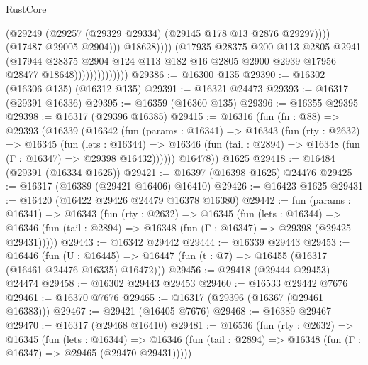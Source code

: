 \begin{lexlean}{RustCore}
\begin{coremodule}
                                          (@29249
                                            (@29257
                                              (@29329 @29334)
                                              (@29145 @178 @13 @2876 @29297))))
                                        (@17487 @29005 @2904)))
                                    @18628))))
                            (@17935
                              @28375
                              @200
                              @113
                              @2805
                              @2941
                              (@17944
                                @28375
                                @2904
                                @124
                                @113
                                @182
                                @16
                                @2805
                                @2900
                                @2939
                                @17956
                                @28477
                                @18648))))))))))))))
@29386 := @16300 @135
@29390 := @16302 (@16306 @135) (@16312 @135)
@29391 := @16321 @24473
@29393 := @16317 (@29391 @16336)
@29395 := @16359 (@16360 @135)
@29396 := @16355 @29395
@29398 := @16317 (@29396 @16385)
@29415 := @16316
    (fun (fn : @88) =>
    @29393
      (@16339
        (@16342
          (fun (params : @16341) =>
          @16343
            (fun (rty : @2632) =>
            @16345
              (fun (lets : @16344) =>
              @16346 (fun (tail : @2894) => @16348 (fun (Γ : @16347) => @29398 @16432))))))
        @16478))
    @1625
@29418 := @16484 (@29391 (@16334 @1625))
@29421 := @16397 (@16398 @1625) @24476
@29425 := @16317 (@16389 (@29421 @16406) @16410)
@29426 := @16423 @1625
@29431 := @16420 (@16422 @29426 @24479 @16378 @16380)
@29442 := fun (params : @16341) =>
  @16343
    (fun (rty : @2632) =>
    @16345
      (fun (lets : @16344) =>
      @16346 (fun (tail : @2894) => @16348 (fun (Γ : @16347) => @29398 (@29425 @29431)))))
@29443 := @16342 @29442
@29444 := @16339 @29443
@29453 := @16446
    (fun (U : @16445) => @16447 (fun (t : @7) => @16455 (@16317 (@16461 @24476 @16335) @16472)))
@29456 := @29418 (@29444 @29453) @24474
@29458 := @16302 @29443 @29453
@29460 := @16533 @29442 @7676
@29461 := @16370 @7676
@29465 := @16317 (@29396 (@16367 (@29461 @16383)))
@29467 := @29421 (@16405 @7676)
@29468 := @16389 @29467
@29470 := @16317 (@29468 @16410)
@29481 := @16536
    (fun (rty : @2632) =>
    @16345
      (fun (lets : @16344) =>
      @16346 (fun (tail : @2894) => @16348 (fun (Γ : @16347) => @29465 (@29470 @29431)))))

\end{coremodule}
\end{lexlean}
